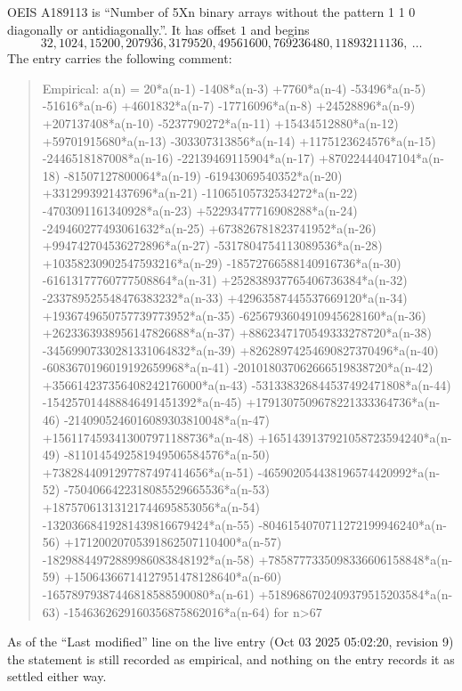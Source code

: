 \documentclass[11pt,a4paper]{article}
\theoremstyle{plain}
\theoremstyle{definition}
\begin{document}
OEIS A189113 is ``Number of 5Xn binary arrays without the pattern 1 1 0 diagonally or antidiagonally.''. It has offset $1$ and begins
\[
32, 1024, 15200, 207936, 3179520, 49561600, 769236480, 11893211136,\ \dots
\]
The entry carries the following comment:
\begin{quote}\small
Empirical: a(n) = 20*a(n-1) -1408*a(n-3) +7760*a(n-4) -53496*a(n-5) -51616*a(n-6) +4601832*a(n-7) -17716096*a(n-8) +24528896*a(n-9) +207137408*a(n-10) -5237790272*a(n-11) +15434512880*a(n-12) +59701915680*a(n-13) -303307313856*a(n-14) +1175123624576*a(n-15) -2446518187008*a(n-16) -22139469115904*a(n-17) +87022444047104*a(n-18) -81507127800064*a(n-19) -61943069540352*a(n-20) +3312993921437696*a(n-21) -11065105732534272*a(n-22) -4703091161340928*a(n-23) +52293477716908288*a(n-24) -249460277493061632*a(n-25) +673826781823741952*a(n-26) +994742704536272896*a(n-27) -5317804754113089536*a(n-28) +10358230902547593216*a(n-29) -18572766588140916736*a(n-30) -61613177760777508864*a(n-31) +252838937765406736384*a(n-32) -233789525548476383232*a(n-33) +42963587445537669120*a(n-34) +1936749650757739773952*a(n-35) -6256793604910945628160*a(n-36) +2623363938956147826688*a(n-37) +8862347170549333278720*a(n-38) -34569907330281331064832*a(n-39) +82628974254690827370496*a(n-40) -6083670196019192659968*a(n-41) -201018037062666519838720*a(n-42) +356614237356408242176000*a(n-43) -531338326844537492471808*a(n-44) -154257014488846491451392*a(n-45) +1791307509678221333364736*a(n-46) -2140905246016089303810048*a(n-47) +1561174593413007971188736*a(n-48) +1651439137921058723594240*a(n-49) -8110145492581949506584576*a(n-50) +7382844091297787497414656*a(n-51) -465902054438196574420992*a(n-52) -7504066422318085529665536*a(n-53) +18757061313121744695853056*a(n-54) -13203668419281439816679424*a(n-55) -8046154070711272199946240*a(n-56) +17120020705391862507110400*a(n-57) -18298844972889986083848192*a(n-58) +7858777335098336606158848*a(n-59) +15064366714127951478128640*a(n-60) -16578979387446818588590080*a(n-61) +5189686702409379515203584*a(n-63) -1546362629160356875862016*a(n-64) for n>67
\end{quote}
As of the ``Last modified'' line on the live entry (Oct 03 2025 05:02:20, revision 9) the statement is
still recorded as empirical, and nothing on the entry records it as settled either way.
\end{document}
